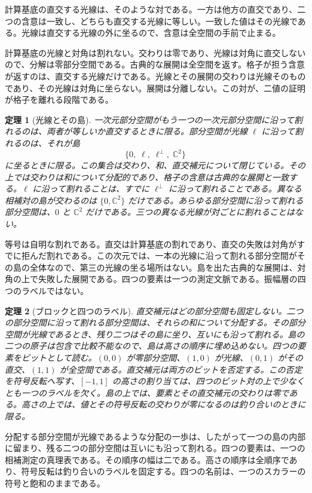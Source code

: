 \documentclass[a4paper]{article}
\newtheorem{theorem}{定理}[section]
\theoremstyle{definition}
\begin{document}
計算基底の直交する光線は、そのような対である。一方は他方の直交であり、二つの含意は一致し、どちらも直交する光線に等しい。一致した値はその光線である。光線は直交する光線の外に坐るので、含意は全空間の手前で止まる。

計算基底の光線と対角は割れない。交わりは零であり、光線は対角に直交しないので、分解は零部分空間である。古典的な展開は全空間を返す。格子が担う含意が返すのは、直交する光線だけである。光線とその展開の交わりは光線そのものであり、その光線は対角に坐らない。展開は分離しない。この対が、二値の証明が格子を離れる段階である。

\begin{theorem}[光線とその島]
\label{thm:island}
一次元部分空間がもう一つの一次元部分空間に沿って割れるのは、両者が等しいか直交するときに限る。部分空間が光線 \(\ell\) に沿って割れるのは、それが島
\[
\{0,\;\ell,\;\ell^\perp,\;\mathbb{C}^2\}
\]
に坐るときに限る。この集合は交わり、和、直交補元について閉じている。その上では交わりは和について分配的であり、格子の含意は古典的な展開と一致する。\(\ell\) に沿って割れることは、すでに \(\ell^\perp\) に沿って割れることである。異なる相補対の島が交わるのは \(\{0,\mathbb{C}^2\}\) だけである。あらゆる部分空間に沿って割れる部分空間は、\(0\) と \(\mathbb{C}^2\) だけである。三つの異なる光線が対ごとに割れることはない。
\end{theorem}

等号は自明な割れである。直交は計算基底の割れであり、直交の失敗は対角がすでに拒んだ割れである。この次元では、一本の光線に沿って割れる部分空間がその島の全体なので、第三の光線の坐る場所はない。島を出た古典的な展開は、対角の上で失敗した展開である。四つの要素は一つの測定文脈である。振幅層の四つのラベルではない。

\begin{theorem}[ブロックと四つのラベル]
\label{thm:blockfour}
直交補元はどの部分空間も固定しない。二つの部分空間に沿って割れる部分空間は、それらの和について分配する。その部分空間が光線であるとき、残り二つはその島に坐り、互いにも沿って割れる。島の二つの原子は包含で比較不能なので、島は高さの順序に埋め込めない。四つの要素をビットとして読む。\((0,0)\) が零部分空間、\((1,0)\) が光線、\((0,1)\) がその直交、\((1,1)\) が全空間である。直交補元は両方のビットを否定する。この否定を符号反転へ写す、\([-1,1]\) の高さの割り当ては、四つのビット対の上で少なくとも一つのラベルを欠く。島の上では、要素とその直交補元の交わりは零である。高さの上では、値とその符号反転の交わりが零になるのは釣り合いのときに限る。
\end{theorem}

分配する部分空間が光線であるような分配の一歩は、したがって一つの島の内部に留まり、残る二つの部分空間は互いにも沿って割れる。四つの要素は、一つの相補測定の真理表である。その順序の幅は二である。高さの順序は全順序であり、符号反転は釣り合いのラベルを固定する。四つの名前は、一つのスカラーの符号と飽和のままである。
\end{document}

